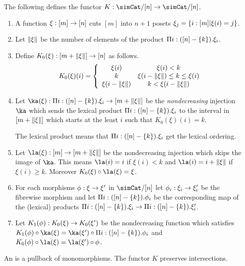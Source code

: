 \documentclass[csh.tex]{subfiles}
\begin{document}
\begin{definition}
The following defines the functor $K\of\simCat/[n]\to\simCat/[n]$.
\begin{enumerate}
\item A function $\xi:[m]\to[n]$ cuts $[m]$ into $n+1$ posets $\xi_j = \left\{i:[m]|\xi(i)=j\right\}$. 
\item Let $\Vert \xi \Vert$ be the number of elements of the product $\Pi i: ([n]-\left\{k\right\}).\xi_i$. 
\item Define $K_0(\xi): [m+\Vert \xi \Vert]\to [n]$ as follows.
\[ 
	K_0(\xi)(i) = \left\{
		\begin{array}{cc}
			\xi(i) & \xi(i)<k \\
			k & \xi(i-\Vert \xi \Vert)\leq k \leq \xi(i)\\
			\xi(i-\Vert \xi \Vert) & k<\xi(i-\Vert \xi \Vert)
		\end{array}
	\right.
\]
\item Let $\ka(\xi)\of\Pi i\of([n]-\set k).\xi_i \to [m+\norm\xi]$ be the \emph{nondecreasing} injection $\ka$ which sends the lexical product $\Pi i:([n]-\left\{k\right\}).\xi_i$ to the interval in $[m+\Vert \xi \Vert]$ which starts at the least $i$ such that $K_0(\xi)(i)=k$.

The lexical product means that $\Pi i:([n]-\left\{k\right\}).\xi_i$ get the lexical ordering. %

\item Let $\la(\xi)\of[m]\to[m+\norm\xi]$ be the nondecreasing injection which skips the image of $\ka$. This means $\la(i)=i$ if $\xi(i)<k$ and $\la(i)=i+\norm\xi$ if $\xi(i)\geq k$. Moreover $K_0(\xi)\circ\la(\xi) = \xi$.
\item For each morphisms $\phi:\xi\to\xi'$ in $\simCat/[n]$ let $\phi_i:\xi_i\to\xi'_i$ be the fibrewise morphism and let $\Pi i:([n]-\left\{k\right\}).\phi_i$ be the corresponding map of the (lexical) products $\Pi i:([n]-\left\{k\right\}).\xi_i\to\Pi i:([n]-\left\{k\right\}).\xi'_i$.
\item Let $K_1(\phi): K_0(\xi)\to K_0(\xi')$ be the nondecreasing function which satisfies $K_1(\phi)\circ \ka(\xi) = \ka(\xi')\circ \Pi i\of([n]-\set k).\phi_i$ and $K_0(\phi)\circ \la(\xi) = \la(\xi')\circ \phi$.
\end{enumerate}
\end{definition}

\begin{lemma} An  is a pullback of monomorphisms. The functor $K$ preserves intersections. \end{lemma}
\end{document}
